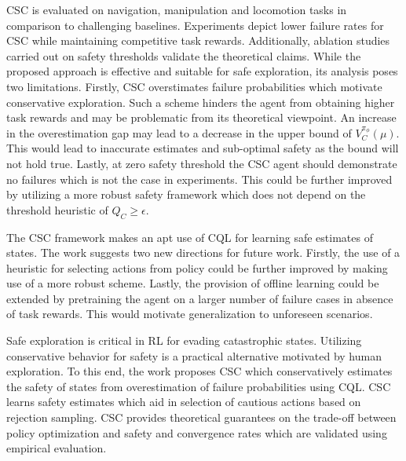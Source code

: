 \documentclass[11pt,letterpaper]{article}
\begin{document}
CSC is evaluated on navigation, manipulation and locomotion tasks in comparison to challenging baselines. Experiments depict lower failure rates for CSC while maintaining competitive task rewards. Additionally, ablation studies carried out on safety thresholds validate the theoretical claims. While the proposed approach is effective and suitable for safe exploration, its analysis poses two limitations. Firstly, CSC overstimates failure probabilities which motivate conservative exploration. Such a scheme hinders the agent from obtaining higher task rewards and may be problematic from its theoretical viewpoint. An increase in the overestimation gap may lead to a decrease in the upper bound of $V_{C}^{\pi_{\phi}}(\mu)$. This would lead to inaccurate estimates and sub-optimal safety as the bound will not hold true. Lastly, at zero safety threshold the CSC agent should demonstrate no failures which is not the case in experiments. This could be further improved by utilizing a more robust safety framework which does not depend on the threshold heuristic of $Q_{C} \geq \epsilon$. 

The CSC framework makes an apt use of CQL for learning safe estimates of states. The work suggests two new directions for future work. Firstly, the use of a heuristic for selecting actions from policy could be further improved by making use of a more robust scheme. Lastly, the provision of offline learning could be extended by pretraining the agent on a larger number of failure cases in absence of task rewards. This would motivate generalization to unforeseen scenarios. 

Safe exploration is critical in RL for evading catastrophic states. Utilizing conservative behavior for safety is a practical alternative motivated by human exploration. To this end, the work proposes CSC which conservatively estimates the safety of states from overestimation of failure probabilities using CQL. CSC learns safety estimates which aid in selection of cautious actions based on rejection sampling. CSC provides theoretical guarantees on the trade-off between policy optimization and safety and convergence rates which are validated using empirical evaluation. 
\end{document}
